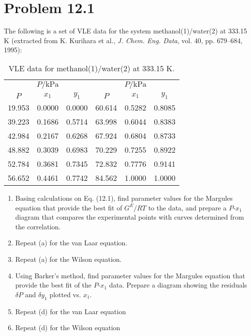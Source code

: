 \documentclass{article}
\begin{document}
\section*{Problem 12.1}
The following is a set of VLE data for the system
methanol(1)/water(2) at 333.15 K
(extracted from K. Kurihara et al., \textit{J. Chem. Eng. Data}, vol.
40, pp. 679–684, 1995):

\begin{table}[h!]
  \centering
  \begin{tabular}{ccc|ccc}
    \toprule
    \multicolumn{3}{c|}{$P/\text{kPa}$} & \multicolumn{3}{c}{$P/\text{kPa}$} \\
    \cmidrule{1-3} \cmidrule{4-6}
    $P$ & $x_1$ & $y_1$ & $P$ & $x_1$ & $y_1$ \\
    \midrule
    19.953 & 0.0000 & 0.0000 & 60.614 & 0.5282 & 0.8085 \\
    39.223 & 0.1686 & 0.5714 & 63.998 & 0.6044 & 0.8383 \\
    42.984 & 0.2167 & 0.6268 & 67.924 & 0.6804 & 0.8733 \\
    48.882 & 0.3039 & 0.6983 & 70.229 & 0.7255 & 0.8922 \\
    52.784 & 0.3681 & 0.7345 & 72.832 & 0.7776 & 0.9141 \\
    56.652 & 0.4461 & 0.7742 & 84.562 & 1.0000 & 1.0000 \\
    \bottomrule
  \end{tabular}
  \caption{VLE data for methanol(1)/water(2) at 333.15 K.}
\end{table}

\begin{enumerate}[label=(\alph*)]
  \item Basing calculations on Eq. (12.1), find parameter values for
    the Margules equation
    that provide the best fit of \(G^E / RT\) to the data, and
    prepare a \(P\)-\(x_1\) diagram
    that compares the experimental points with curves determined from
    the correlation.

  \item Repeat (a) for the van Laar equation.

  \item Repeat (a) for the Wilson equation.

  \item Using Barker’s method, find parameter values for the Margules
    equation that provide
    the best fit of the \(P\)-\(x_1\) data. Prepare a diagram showing
    the residuals \(\delta P\)
    and \(\delta y_1\) plotted vs. \(x_1\).
  \item Repeat (d) for the van Laar equation
  \item Repeat (d) for the Wilson equation
\end{enumerate}
\end{document}
